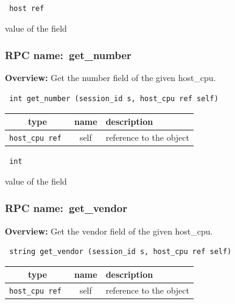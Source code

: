 {\tt 
host ref
}


value of the field
\vspace{0.3cm}
\vspace{0.3cm}
\vspace{0.3cm}
\subsubsection{RPC name:~get\_number}

{\bf Overview:} 
Get the number field of the given host\_cpu.

\begin{verbatim} int get_number (session_id s, host_cpu ref self)\end{verbatim}



 
\vspace{0.3cm}
\begin{tabular}{|c|c|p{7cm}|}
 \hline
{\bf type} & {\bf name} & {\bf description} \\ \hline
{\tt host\_cpu ref } & self & reference to the object \\ \hline 

\end{tabular}

\vspace{0.3cm}

{\tt 
int
}


value of the field
\vspace{0.3cm}
\vspace{0.3cm}
\vspace{0.3cm}
\subsubsection{RPC name:~get\_vendor}

{\bf Overview:} 
Get the vendor field of the given host\_cpu.

\begin{verbatim} string get_vendor (session_id s, host_cpu ref self)\end{verbatim}



 
\vspace{0.3cm}
\begin{tabular}{|c|c|p{7cm}|}
 \hline
{\bf type} & {\bf name} & {\bf description} \\ \hline
{\tt host\_cpu ref } & self & reference to the object \\ \hline 

\end{tabular}

